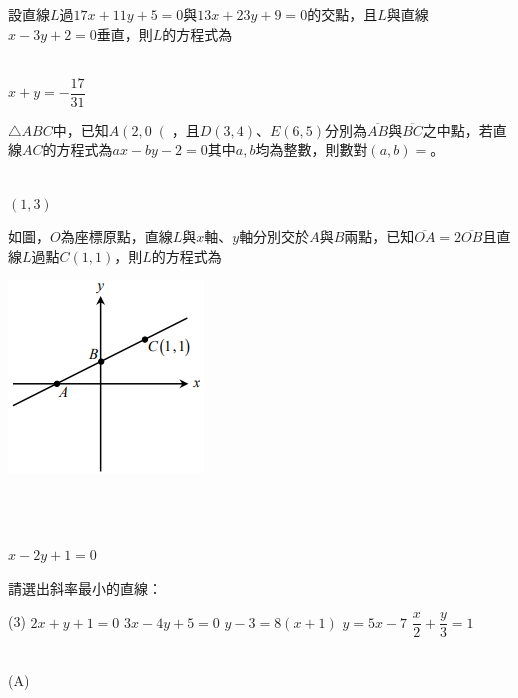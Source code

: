 \documentclass
[answers]
{exam}
\newcommand\ul[1]{\uline{\hspace*{#1}}}
\theoremstyle{definition}
\begin{document}
\begin{questions}
\question

設直線$L$過$17x+11y+5=0$與$13x+23y+9=0$的交點，且$L$與直線$x-3y+2=0$垂直，則$L$的方程式為\ul{50pt}
\\ 
\begin{solution}~\\
	$x + y = - \dfrac{17}{31}$
\end{solution}

\question

$\triangle ABC$中，已知$A\left( 2,0\right($，且$D\left( 3,4\right)$、$E\left( 6,5\right)$分別為$\overline{AB}$與$\overline{BC}$之中點，若直線$AC$的方程式為$ax-by-2=0$其中$a,b$均為整數，則數對$\left( a,b \right)=$\ul{50pt}。
\\ 
\begin{solution}~\\
	$\left( 1,3 \right)$
\end{solution}

\question

\begin{minipage}[t]{0.7\linewidth}
	如圖，$O$為座標原點，直線$L$與$x$軸、$y$軸分別交於$A$與$B$兩點，已知$\overline{OA}=2\overline{OB}$且直線$L$過點$C\left( 1,1\right)$，則$L$的方程式為\ul{50pt}
\end{minipage}
\hfill
\begin{minipage}[t]{0.3\linewidth}
	\vspace*{-0.3cm}
	\includegraphics[scale=1]{./chapter_3/figure/10.png}
	\raggedleft %
\end{minipage}
\\ 
\begin{solution}~\\
	$x-2y+1=0$
\end{solution}

\question

請選出斜率最小的直線：
\begin{tasks}(3)
	\task $2x+y+1=0$
	\task $3x-4y+5=0$
	\task $y-3=8\left( x+1\right)$
	\task $y=5x-7$
	\task $\dfrac{x}{2}+\dfrac{y}{3}=1$
\end{tasks}
\begin{solution}~\\
	(A)
\end{solution}


\end{questions}
\end{document}
